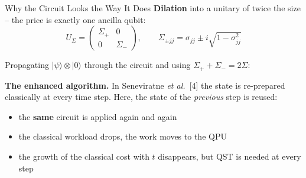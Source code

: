 \begin{frame}[t]{}
\begin{postercolumn}
\begin{block}{Why the Circuit Looks the Way It Does}
    \textbf{Dilation} into a unitary of twice the size -- the price is
    exactly one ancilla qubit:
    \[ U_\Sigma = \begin{pmatrix} \Sigma_+ & 0\\ 0 & \Sigma_-\end{pmatrix},
       \qquad
       \Sigma_{\pm jj} = \sigma_{jj} \pm i\sqrt{1-\sigma_{jj}^2} \]


    Propagating $|\psi\rangle\otimes|0\rangle$ through the circuit and using
    $\Sigma_++\Sigma_-=2\Sigma$:

    \smallskip

    \textbf{The enhanced algorithm.} In Seneviratne \emph{et al.}~[4] the state is
    re-prepared classically at every time step. Here, the state of the
    \emph{previous} step is reused:
    \begin{itemize}\tightlist
      \item the \textbf{same} circuit is applied again and again
      \item the classical workload drops, the work moves to the QPU
      \item the growth of the classical cost with $t$ disappears, but QST is needed at every step
    \end{itemize}
  \end{block}


\end{postercolumn}
\end{frame}
